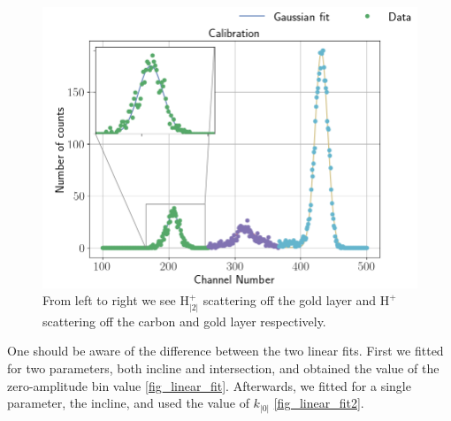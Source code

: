 \begin{figure}[t]
\centering
\includegraphics[width=0.99\columnwidth]{gaussian_fit2}
\caption{From left to right we see $\mathrm{H_|2|^{+}}$ scattering off the gold layer
and $\mathrm{H^+}$ scattering off the carbon and gold layer respectively.}
\label{fig_gaussian_fit2}
\end{figure}
One should be aware of the difference between the two linear fits. First we
fitted for two parameters, both incline and intersection, and obtained the
value of the zero-amplitude bin value \cref{fig_linear_fit}. Afterwards, we fitted for a single
parameter, the incline, and used the value of $k_|0|$ \cref{fig_linear_fit2}.

